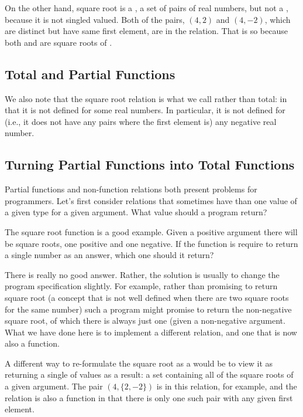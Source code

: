 \documentclass[letterpaper,10pt,english]{sphinxmanual}
\begin{document}
On the other hand, square root is a , a set of pairs of real
numbers, but not a , because it is not singled valued. Both
of the pairs, \((4,2)\) and \((4,-2)\), which are distinct but
have same first element, are in the relation. That is so because both
 and  are square roots of .


\subsection{Total and Partial Functions}
\label{\detokenize{05-verifying-logical-specifications:total-and-partial-functions}}
We also note that the square root relation  is
what we call  rather than total: in that it is not defined
for some real numbers. In particular, it is not defined for (i.e., it
does not have any pairs where the first element is) any negative real
number.


\subsection{Turning Partial Functions into Total Functions}
\label{\detokenize{05-verifying-logical-specifications:turning-partial-functions-into-total-functions}}
Partial functions and non-function relations both present problems for
programmers. Let’s first consider relations that sometimes have 
than one value of a given type for a given argument. What value should
a program return?

The square root function is a good example. Given a positive argument
there will be  square roots, one positive and one negative. If
the function is require to return a single number as an answer, which
one should it return?

There is really no good answer. Rather, the solution is usually to
change the program specification slightly. For example, rather than
promising to return  square root (a concept that is not well
defined when there are two square roots for the same number) such a
program might promise to return the non-negative square root, of which
there is always just one (given a non-negative argument. What we have
done here is to implement a different relation, and one that is now
also a function.

A different way to re-formulate the square root  as a
 would be to view it as returning a single  of values
as a result: a set containing all of the square roots of a given
argument.  The pair \((4, \{2, -2\})\) is in this relation, for
example, and the relation is also a function in that there is only one
such pair with any given first element.
\end{document}
